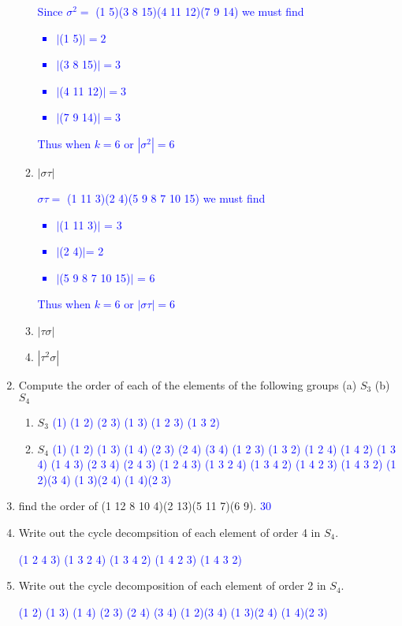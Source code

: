 \documentclass[10pt,a4paper]{report}
\newcommand{\BLUE}[1]{\textcolor{blue}{#1}}
\begin{document}
\begin{enumerate}
\begin{enumerate}
	\BLUE{Since $\sigma^2 = $ (1 5)(3 8 15)(4 11 12)(7 9 14) we must find 
	\begin{itemize}
		\item $|$(1 5)$| = 2$
		\item $|$(3 8 15)$| = 3$
		\item $|$(4 11 12)$| = 3$
		\item $|$(7 9 14)$| = 3$
	\end{itemize} Thus when $k=6$ or $|\sigma^2|=6$
	}
	
	\item $|\sigma\tau|$
	
	\BLUE{
		$\sigma\tau = $ (1 11 3)(2 4)(5 9 8 7 10 15) we must find
		\begin{itemize}
			\item $|$(1 11 3)$|$ = 3
			\item $|$(2 4)$|$= 2
			\item $|$(5 9 8 7 10 15)$|$ = 6
		\end{itemize}  Thus when $k=6$ or $|\sigma\tau|=6$
	}
	
	\item $|\tau \sigma|$
	\item $|\tau^2\sigma|$
\end{enumerate}

\item Compute the order of each of the elements of the following groups (a) $S_3$ (b) $S_4$
\begin{enumerate}
	\item $S_3$ \BLUE{(1) (1 2) (2 3) (1 3) (1 2 3) (1 3 2)}
	\item $S_4$ \BLUE{(1) (1 2) (1 3) (1 4) (2 3) (2 4) (3 4) (1 2 3) (1 3 2) (1 2 4) (1 4 2) (1 3 4) (1 4 3) (2 3 4) (2 4 3) (1 2 4 3) (1 3 2 4) (1 3 4 2) (1 4 2 3) (1 4 3 2) (1 2)(3 4) (1 3)(2 4) (1 4)(2 3)}
\end{enumerate}

\item find the order of (1 12 8 10 4)(2 13)(5 11 7)(6 9). \BLUE{30}

\item Write out the cycle decompsition of each element of order 4 in $S_4$.

\BLUE{(1 2 4 3) (1 3 2 4) (1 3 4 2) (1 4 2 3) (1 4 3 2)}

\item Write out the cycle decomposition of each element of order 2 in $S_4$.

\BLUE{(1 2) (1 3) (1 4) (2 3) (2 4) (3 4) (1 2)(3 4) (1 3)(2 4) (1 4)(2 3)
}


\end{enumerate}
\end{document}
